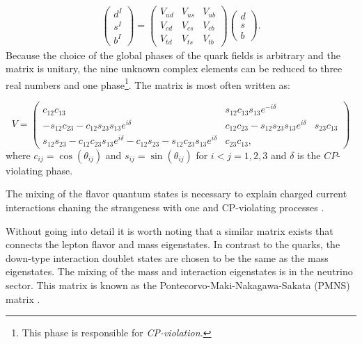 \begin{equation}
\begin{split}
\begin{pmatrix} d^I \\ s^I \\ b^I \end{pmatrix} = 
\begin{pmatrix} 
V_{ud} & V_{us} & V_{ub} \\
V_{cd} & V_{cs} & V_{cb} \\
V_{td} & V_{ts} & V_{tb}
\end{pmatrix}
\begin{pmatrix} d \\ s \\ b \end{pmatrix}.
\end{split}
\end{equation}
Because the choice of the global phases of the quark fields is arbitrary and the matrix is unitary, the nine unknown complex elements can be reduced to three real numbers and one phase\footnote{This phase is responsible for \textit{CP-violation.}}. The matrix is most often written as:


\begin{equation}
V = \begin{pmatrix}
c_{12}c_{13} & s_{12}c_{13} s_{13}e^{-i\delta} \\
-s_{12}c_{23} - c_{12}s_{23}s_{13} e^{i\delta} & c_{12}c_{23} - s_{12}s_{23}s_{13}e^{i\delta} & s_{23}c_{13} \\
s_{12}s_{23} - c_{12}c_{23}s_{13}e^{i\delta} -c_{12}s_{23} - s_{12}c_{23}s_{13}e^{i\delta} & c_{23}c_{13},
\end{pmatrix}
\end{equation}
where $c_{ij} = \cos\left(\theta_{ij}\right)$ and  $s_{ij} = \sin\left(\theta_{ij}\right)$ for $i<j = 1,2,3$ and $\delta$ is the $CP$-violating phase.

The mixing of the flavor quantum states is necessary to explain charged current interactions chaning the strangeness with one \cite{Glashow:1970gm} and CP-violating processes \cite{1964PhRvL}.

Without going into detail it is worth noting that a similar matrix exists that connects the lepton flavor and mass eigenstates. In contrast to the quarks, the down-type interaction doublet states are chosen to be the same as the mass eigenstates. The mixing of the mass and interaction eigenstates is in the neutrino sector. This matrix is known as the Pontecorvo-Maki-Nakagawa-Sakata (PMNS) matrix \cite{doi:10.1143/PTP.28.870}.

